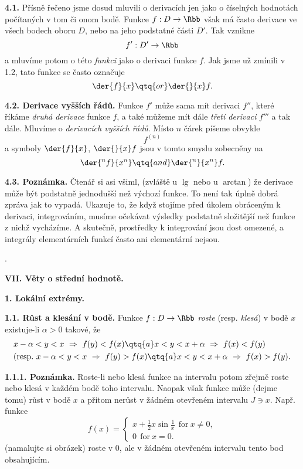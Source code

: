 \documentclass[12pt]{article}
\begin{document}
{ \bigskip
 
 {\bf 4.1.} Přísně řečeno jsme dosud mluvili o derivacích jen jako o číselných hodnotách počítaných v tom či onom bodě. Funkce $f:D\to\Rbb$ však má často derivace ve všech bodech oboru $D$, nebo na jeho podstatné části $D'$. Tak vznikne
 $$
 f':D'\to\Rbb
 $$
 a mluvíme potom o této {\em funkci} jako o derivaci funkce $f$. Jak jsme už zmínili v  1.2, tato funkce se často označuje
 $$
 \der{f}{x} \qtq{or} \der{}{x}f.
 $$
 
 \bigskip
 
 {\bf 4.2. Derivace vyšších řádů.} Funkce $f'$ může sama mít derivaci $f''$, které říkáme {\em druhá derivace} funkce $f$, a také můžeme mít dále  {\em třetí derivaci} $f'''$ a tak dále. Mluvíme o {\em derivacích vyšších řádů}. Místo  $n$ čárek píšeme obvykle 
$$
 f^{(n)}
 $$
 a symboly $
 \der{f}{x}$, $\der{}{x}f$ jsou v tomto smyslu zobecněny na
 $$
 \der{^nf}{x^n} \qtq{and} \der{^n}{x^n}f.
 $$
 
 \bigskip
 
 {\bf 4.3. Poznámka.} Čtenář si asi všiml,  (zvláště u
  $\lg$ nebo u $\arctan$) že derivace může být podstatně jednodušší než výchozí funkce. To není tak úplně dobrá zpráva jak to vypadá. Ukazuje to, že když stojíme před úkolem obráceným k derivaci, integrováním, musíme očekávat výsledky podstatně složitější než funkce z nichž vycházíme. A skutečně, prostředky k integrování jsou dost omezené, a integrály elementárních funkcí často ani elementární nejsou.
	
	\newpage 
	.
 

\newpage

\centerline{\Large\bf VII.  Věty o střední hodnotě.} 
 
 \vskip10mm
 
 {\large\bf 1. Lokální extrémy.}
 
 \bigskip
 
 {\bf 1.1. Růst a klesání v bodě.} Funkce $f:D\to \Rbb$ 
 {\em roste} (resp. {\em klesá}) v bodě $x$ existuje-li $\alpha>0$ takové, že
 $$
 \begin{aligned}
 &x-\alpha <y<x\  \Rightarrow\  f(y)<f(x)\qtq{a}
 x<y<x+\alpha\  \Rightarrow\  f(x)<f(y)\\
 &(\text{resp.}\ x-\alpha <y<x\  \Rightarrow\  f(y)>f(x)\qtq{a}
 x<y<x+\alpha\  \Rightarrow\  f(x)>f(y). 
 \end{aligned}
 $$
 
 \medskip
 
 {\bf 1.1.1. Poznámka.}  Roste-li nebo klesá  funkce na intervalu
 potom zřejmě roste nebo klesá v každém bodě toho intervalu. Naopak však
funkce může (dejme tomu) růst v bodě $x$ a přitom nerůst v žádném otevřeném  intervalu $J\ni x$.
 Např. funkce
 $$
 f(x)=\begin{cases} x+\frac12x\sin\frac1{x} \ \ \text{for} \ x\neq 0,\\
                    0 \ \ \text{for} \ x=0.\end{cases}
$$ 
(namalujte si obrázek) roste v  0, ale v žádném otevřeném intervalu tento bod obsahujícím.

}
\end{document}
